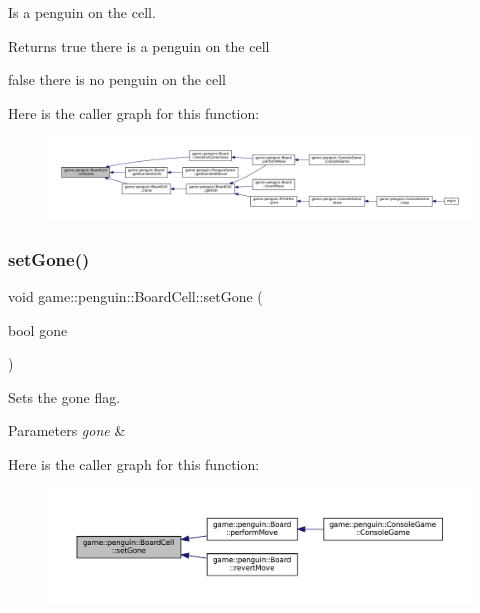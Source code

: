 Is a penguin on the cell. 

\begin{DoxyReturn}{Returns}
true there is a penguin on the cell 

false there is no penguin on the cell 
\end{DoxyReturn}
Here is the caller graph for this function\+:
\nopagebreak
\begin{figure}[H]
\begin{center}
\leavevmode
\includegraphics[width=350pt]{classgame_1_1penguin_1_1_board_cell_a12cd55e333821bcecaa201dde758c1a1_icgraph}
\end{center}
\end{figure}
\mbox{\label{classgame_1_1penguin_1_1_board_cell_a097c6986431cadcf0adac373fe01ccee}} 
\subsubsection{\texorpdfstring{set\+Gone()}{setGone()}}
{\footnotesize\ttfamily void game\+::penguin\+::\+Board\+Cell\+::set\+Gone (\begin{DoxyParamCaption}\item[{bool}]{gone }\end{DoxyParamCaption})\hspace{0.3cm}{\ttfamily [inline]}}



Sets the gone flag. 


\begin{DoxyParams}{Parameters}
{\em gone} & \\
\hline
\end{DoxyParams}
Here is the caller graph for this function\+:
\nopagebreak
\begin{figure}[H]
\begin{center}
\leavevmode
\includegraphics[width=350pt]{classgame_1_1penguin_1_1_board_cell_a097c6986431cadcf0adac373fe01ccee_icgraph}
\end{center}
\end{figure}
\mbox{\label{classgame_1_1penguin_1_1_board_cell_a5d3fd7b5a5e170bd6fbc101f5240f4b1}} 
